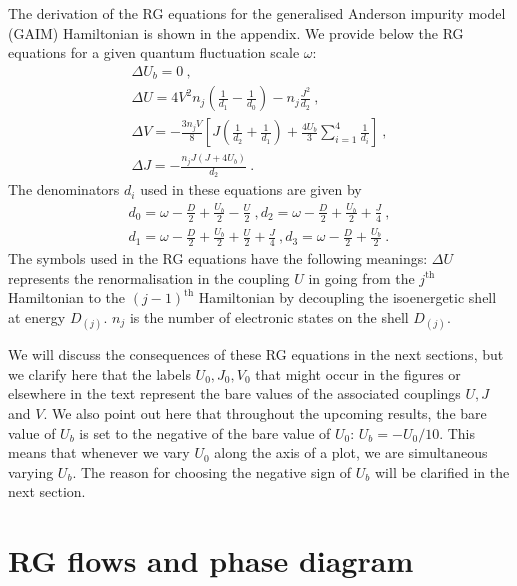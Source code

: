 \documentclass[reprint,superscriptaddress,floatfix]{revtex4-2}
\begin{document}
The derivation of the RG equations for the generalised Anderson impurity model (GAIM) Hamiltonian is shown in the appendix. We provide below the RG equations for a given quantum fluctuation scale \(\omega\):
\begin{gather}
	\Delta U_b = 0~,\\
	\Delta U = 4V^2 n_j\left(\frac{1}{d_1} - \frac{1}{d_0}\right) - n_j\frac{J^2}{d_2}~,\\
	\Delta V = -\frac{3n_j V}{8}\left[J\left(\frac{1}{d_2} + \frac{1}{d_1}\right) +  \frac{4U_b}{3}\sum_{i=1}^4 \frac{1}{d_i}\right]~,\\
	\Delta J = -\frac{n_j J\left(J + 4U_b\right)}{d_2}~.
\end{gather}
The denominators \(d_i\) used in these equations are given by
\begin{gather}
	d_0 = \omega - \frac{D}{2} + \frac{U_b}{2} - \frac{U}{2}~,d_2 = \omega - \frac{D}{2} + \frac{U_b}{2} + \frac{J}{4}~,\\
	d_1 = \omega - \frac{D}{2} + \frac{U_b}{2} + \frac{U}{2} + \frac{J}{4}~,d_3 = \omega - \frac{D}{2} + \frac{U_b}{2}~.
\end{gather}
The symbols used in the RG equations have the following meanings: \(\Delta U\) represents the renormalisation in the coupling \(U\) in going from the \(j^\text{th}\) Hamiltonian to the \(\left( j-1 \right) ^\text{th}\) Hamiltonian by decoupling the isoenergetic shell at energy \(D_{(j)}\). \(n_j\) is the number of electronic states on the shell \(D_{(j)}\).

We will discuss the consequences of these RG equations in the next sections, but we clarify here that the labels \(U_0,J_0,V_0\) that might occur in the figures or elsewhere in the text represent the bare values of the associated couplings \(U,J\) and \(V\). We also point out here that throughout the upcoming results, the bare value of \(U_b\) is set to the negative of the bare value of \(U_0\): \(U_b = -U_0/10\). This means that whenever we vary \(U_0\) along the axis of a plot, we are simultaneous varying \(U_b\). The reason for choosing the negative sign of \(U_b\) will be clarified in the next section.

\section{RG flows and phase diagram}
\end{document}
